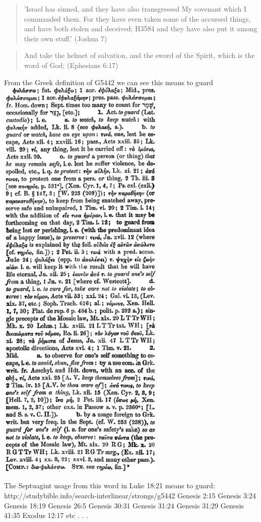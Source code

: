 \documentclass[11pt]{article}
\begin{document}
\begin{thebibliography}{37}
\begin{quote}
'Israel has sinned, and they have also transgressed My covenant which I commanded them. For they have even taken some of the accursed things, and have both stolen and deceived; H3584  and they have also put it among their own stuff.'\newline
(Joshua 7)\newline
\end{quote}
\begin{quote}
And take the helmet of salvation, and the sword of the Spirit, which is the word of God; (Ephesians 6:17)
\end{quote}
From the Greek definition of G5442 we can see this means to guard 
\includegraphics[width=8cm]{guard_greek}

The Septuagint usage from this word in Luke 18:21 means to guard:
http://studybible.info/search-interlinear/strongs/g5442
Genesis 2:15
Genesis 3:24
Genesis 18:19
Genesis 26:5
Genesis 30:31
Genesis 31:24
Genesis 31:29
Genesis 41:35
Exodus 12:17
etc . . .


\end{thebibliography}
\end{document}
